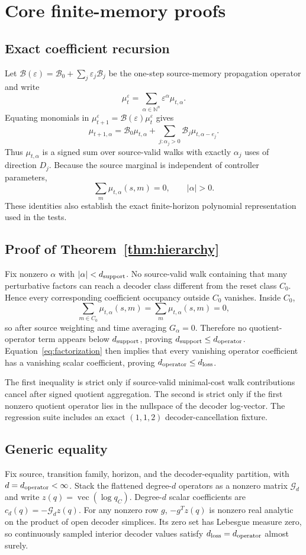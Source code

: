\section{Core finite-memory proofs}
\label{app:core}

\subsection{Exact coefficient recursion}
Let $\mathcal B(\varepsilon)=\mathcal B_0+\sum_j\varepsilon_j\mathcal B_j$ be the one-step source-memory propagation operator and write
\[
\mu_t^\varepsilon=\sum_{\alpha\in\mathbb N^n}\varepsilon^\alpha\mu_{t,\alpha}.
\]
Equating monomials in $\mu_{t+1}^\varepsilon=\mathcal B(\varepsilon)\mu_t^\varepsilon$ gives
\[
\mu_{t+1,\alpha}=\mathcal B_0\mu_{t,\alpha}
+\sum_{j:\alpha_j>0}\mathcal B_j\mu_{t,\alpha-e_j}.
\]
Thus $\mu_{t,\alpha}$ is a signed sum over source-valid walks with exactly $\alpha_j$ uses of direction $D_j$. Because the source marginal is independent of controller parameters,
\[
\sum_m\mu_{t,\alpha}(s,m)=0,\qquad |\alpha|>0.
\]
These identities also establish the exact finite-horizon polynomial representation used in the tests.

\subsection{Proof of Theorem~\ref{thm:hierarchy}}
Fix nonzero $\alpha$ with $|\alpha|<d_{\mathrm{support}}$. No source-valid walk containing that many perturbative factors can reach a decoder class different from the reset class $C_0$. Hence every corresponding coefficient occupancy outside $C_0$ vanishes. Inside $C_0$,
\[
\sum_{m\in C_0}\mu_{t,\alpha}(s,m)
=\sum_m\mu_{t,\alpha}(s,m)=0,
\]
so after source weighting and time averaging $G_\alpha=0$. Therefore no quotient-operator term appears below $d_{\mathrm{support}}$, proving $d_{\mathrm{support}}\leq d_{\mathrm{operator}}$. Equation~\eqref{eq:factorization} then implies that every vanishing operator coefficient has a vanishing scalar coefficient, proving $d_{\mathrm{operator}}\leq d_{\mathrm{loss}}$.

The first inequality is strict only if source-valid minimal-cost walk contributions cancel after signed quotient aggregation. The second is strict only if the first nonzero quotient operator lies in the nullspace of the decoder log-vector. The regression suite includes an exact $(1,1,2)$ decoder-cancellation fixture.

\subsection{Generic equality}
Fix source, transition family, horizon, and the decoder-equality partition, with $d=d_{\mathrm{operator}}<\infty$. Stack the flattened degree-$d$ operators as a nonzero matrix $\mathcal G_d$ and write $z(q)=\operatorname{vec}(\log q_C)$. Degree-$d$ scalar coefficients are $c_d(q)=-\mathcal G_dz(q)$. For any nonzero row $g$, $-g^Tz(q)$ is nonzero real analytic on the product of open decoder simplices. Its zero set has Lebesgue measure zero, so continuously sampled interior decoder values satisfy $d_{\mathrm{loss}}=d_{\mathrm{operator}}$ almost surely.

